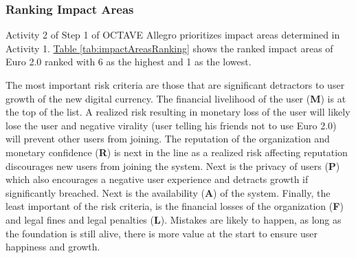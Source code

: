 \documentclass[a4paper,12pt]{article} %
\newcommand{\hypertableref}[1]{\hyperref[#1]{Table \ref{#1}}}
\begin{document}
{\subsubsection{Ranking Impact Areas} \label{sssec:5.1:ranking}

Activity 2 of Step 1 of OCTAVE Allegro prioritizes impact areas determined in Activity 1. \hypertableref{tab:impactAreasRanking} shows the ranked impact areas of Euro 2.0 ranked with 6 as the highest and 1 as the lowest.

\begin{center}
\end{center}
\label{tab:impactAreasRanking}

The most important risk criteria are those that are significant detractors to user growth of the new digital currency. The financial livelihood of the user (\textbf{M}) is at the top of the list. A realized risk resulting in monetary loss of the user will likely lose the user and negative virality (user telling his friends not to use Euro 2.0) will prevent other users from joining.  The reputation of the organization and monetary confidence (\textbf{R}) is next in the line as a realized risk affecting reputation discourages new users from joining the system. Next is the privacy of users (\textbf{P}) which also encourages a negative user experience and detracts growth if significantly breached. Next is the availability (\textbf{A}) of the system. Finally, the least important of the risk criteria, is the financial losses of the organization (\textbf{F}) and legal fines and legal penalties (\textbf{L}). Mistakes are likely to happen, as long as the foundation is still alive, there is more value at the start to ensure user happiness and growth.

}
\end{document}
